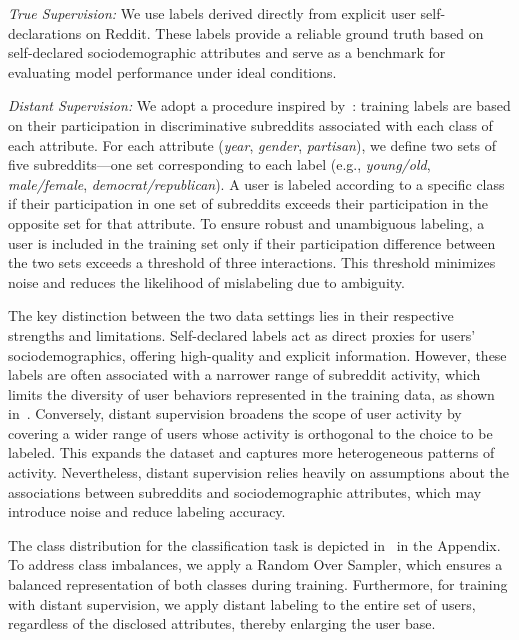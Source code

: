 \emph{True Supervision:} We use labels derived directly from explicit user self-declarations on Reddit.
These labels provide a reliable ground truth based on self-declared sociodemographic attributes and serve as a benchmark for evaluating model performance under ideal conditions.

\emph{Distant Supervision:}
We adopt a procedure inspired by~\citet{waller2021quantifying}:
training labels are based on their participation in discriminative subreddits associated with each class of each attribute.
For each attribute (\emph{year}, \emph{gender}, \emph{partisan}), we define two sets of five subreddits—one set corresponding to each label (e.g., \emph{young/old}, \emph{male/female}, \emph{democrat/republican}).
A user is labeled according to a specific class if their participation in one set of subreddits exceeds their participation in the opposite set for that attribute.
To ensure robust and unambiguous labeling, a user is included in the training set only if their participation difference between the two sets exceeds a threshold of three interactions.
This threshold minimizes noise and reduces the likelihood of mislabeling due to ambiguity.

The key distinction between the two data settings lies in their respective strengths and limitations.
Self-declared labels act as direct proxies for users’ sociodemographics, offering high-quality and explicit information.
However, these labels are often associated with a narrower range of subreddit activity, which limits the diversity of user behaviors represented in the training data, as shown in~.
Conversely, distant supervision broadens the scope of user activity by covering a wider range of users whose activity is orthogonal to the choice to be labeled.
This expands the dataset and captures more heterogeneous patterns of activity.
Nevertheless, distant supervision relies heavily on assumptions about the associations between subreddits and sociodemographic attributes, which may introduce noise and reduce labeling accuracy.

The class distribution for the classification task is depicted in~ in the Appendix.
To address class imbalances, we apply a Random Over Sampler, which ensures a balanced representation of both classes during training.
Furthermore, for training with distant supervision, we apply distant labeling to the entire set of users, regardless of the disclosed attributes, thereby enlarging the user base.


